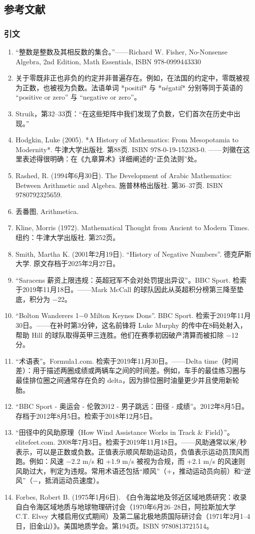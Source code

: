 \subsection{参考文献}
\subsubsection{引文}
\begin{enumerate}
\item “整数是整数及其相反数的集合。”——Richard W. Fisher, No-Nonsense Algebra, 2nd Edition, Math Essentials, ISBN 978-0999443330
\item 关于零既非正也非负的约定并非普遍存在。例如，在法国的约定中，零既被视为正数，也被视为负数。法语单词 *positif* 与 *négatif* 分别等同于英语的 “positive or zero” 与 “negative or zero”。
\item Struik，第32–33页：“在这些矩阵中我们发现了负数，它们首次在历史中出现。”
\item Hodgkin, Luke (2005). *A History of Mathematics: From Mesopotamia to Modernity*. 牛津大学出版社. 第88页. ISBN 978-0-19-152383-0. ——刘徽在这里表述得很明确：在《九章算术》详细阐述的“正负法则”处。
\item Rashed, R. (1994年6月30日). The Development of Arabic Mathematics: Between Arithmetic and Algebra. 施普林格出版社. 第36–37页. ISBN 9780792325659.
\item 丢番图, Arithmetica.
\item Kline, Morris (1972). Mathematical Thought from Ancient to Modern Times. 纽约：牛津大学出版社. 第252页。
\item Smith, Martha K. (2001年2月19日). “History of Negative Numbers”. 德克萨斯大学. 原文存档于2025年2月27日。
\item “Saracens 薪资上限违规：英超冠军不会对处罚提出异议”。BBC Sport. 检索于2019年11月18日。——Mark McCall 的球队因此从英超积分榜第三降至垫底，积分为 −22。
\item “Bolton Wanderers 1−0 Milton Keynes Dons”. BBC Sport. 检索于2019年11月30日。——在补时第3分钟，这名前锋将 Luke Murphy 的传中在8码处射入，帮助 Hill 的球队取得英甲三连胜。他们在赛季初因破产清算而被扣除 −12 分。
\item “术语表”。Formula1.com. 检索于2019年11月30日。——Delta time（时间差）：用于描述两圈成绩或两辆车之间的时间差。例如，车手的最佳练习圈与最佳排位圈之间通常存在负的 delta，因为排位圈时油量更少并且使用新轮胎。
\item “BBC Sport - 奥运会 - 伦敦2012 - 男子跳远：田径 - 成绩”。2012年8月5日。存档于2012年8月5日。检索于2018年12月5日。
\item  “田径中的风助原理（How Wind Assistance Works in Track & Field）”。elitefeet.com. 2008年7月3日。检索于2019年11月18日。——风助通常以米/秒表示，可以是正数或负数。正值表示顺风帮助运动员，负值表示运动员顶风而跑。例如：风速 −2.2 m/s 和 +1.9 m/s 被视为合规，而 +2.1 m/s 的风速则风助过大，判定为违规。常用术语还包括“顺风”（+，推动运动员向前）和“逆风”（−，抵消运动员速度）。
\item Forbes, Robert B. (1975年1月6日). 《白令海盆地及邻近区域地质研究：收录自白令海区域地质与地球物理研讨会（1970年6月26–28日，阿拉斯加大学 C.T. Elvey 大楼启用仪式期间）及第二届北极地质国际研讨会（1971年2月1–4日，旧金山）》。美国地质学会。第194页。ISBN 9780813721514。

\end{enumerate}

